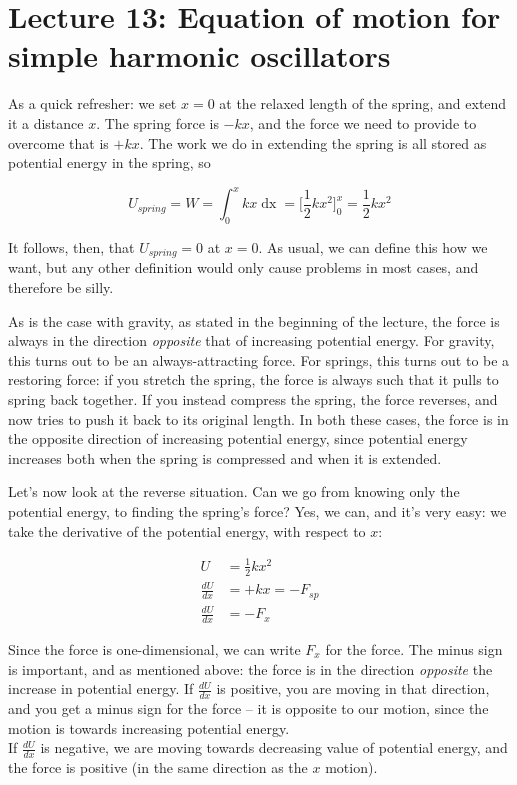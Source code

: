 
\section{Lecture 13: Equation of motion for simple harmonic oscillators}


As a quick refresher: we set $x = 0$ at the relaxed length of the spring, and extend it a distance $x$. The spring force is $-k x$, and the force we need to provide to overcome that is $+ k x$. The work we do in extending the spring is all stored as potential energy in the spring, so

\begin{equation}
U_{spring} = W = \int_0^x k x \mathop{dx} = \Big[\frac{1}{2} k x^2\Big]_0^x = \frac{1}{2} k x^2
\end{equation}

It follows, then, that $U_{spring} = 0$ at $x = 0$. As usual, we can define this how we want, but any other definition would only cause problems in most cases, and therefore be silly.

As is the case with gravity, as stated in the beginning of the lecture, the force is always in the direction \emph{opposite} that of increasing potential energy. For gravity, this turns out to be an always-attracting force. For springs, this turns out to be a restoring force: if you stretch the spring, the force is always such that it pulls to spring back together. If you instead compress the spring, the force reverses, and now tries to push it back to its original length. In both these cases, the force is in the opposite direction of increasing potential energy, since potential energy increases both when the spring is compressed and when it is extended.

Let's now look at the reverse situation. Can we go from knowing only the potential energy, to finding the spring's force? Yes, we can, and it's very easy: we take the derivative of the potential energy, with respect to $x$:

\begin{align}
U &= \frac{1}{2} k x^2\\
\frac{dU}{dx} &= + k x = - F_{sp}\\
\frac{dU}{dx} &= -F_x
\end{align}

Since the force is one-dimensional, we can write $F_x$ for the force. The minus sign is important, and as mentioned above: the force is in the direction \emph{opposite} the increase in potential energy. If $\frac{dU}{dx}$ is positive, you are moving in that direction, and you get a minus sign for the force -- it is opposite to our motion, since the motion is towards increasing potential energy.\\
If $\frac{dU}{dx}$ is negative, we are moving towards decreasing value of potential energy, and the force is positive (in the same direction as the $x$ motion).

